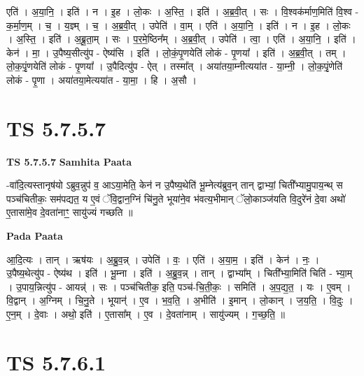 \documentclass[17pt]{extarticle}
\begin{document}
एति॑ । अ॒या॒नि॒ । इति॑ । न । इ॒ह । लो॒कः । अ॒स्ति॒ । इति॑ । अ॒ब्र॒वी॒त् । सः । वि॒श्वक॑र्माण॒मिति॑ वि॒श्व - क॒र्मा॒ण॒म् । च॒ । य॒ज्ञ्म् । च॒ । अ॒ब्र॒वी॒त् । उपेति॑ । वा॒म् । एति॑ । अ॒या॒नि॒ । इति॑ । न । इ॒ह । लो॒कः । अ॒स्ति॒ । इति॑ । अ॒ब्रू॒ता॒म् । सः । प॒र॒मे॒ष्ठिन᳚म् । अ॒ब्र॒वी॒त् । उपेति॑ । त्वा॒ । एति॑ । अ॒या॒नि॒ । इति॑ । केन॑ । मा॒ । उ॒पैष्य॒सीत्यु॑प - ऐष्य॑सि । इति॑ । लो॒कं॒पृ॒णयेति॑ लोकं - पृ॒णया᳚ । इति॑ । अ॒ब्र॒वी॒त् । तम् । लो॒क॒पृं॒णयेति॑ लोकं - पृ॒णया᳚ । उ॒पैदित्यु॑प - ऐत् । तस्मा᳚त् । अया॑तया॒म्नीत्यया॑त - या॒म्नी॒ । लो॒क॒पृं॒णेति॑ लोकं - पृ॒णा । अया॑तया॒मेत्यया॑त - या॒मा॒ । हि । अ॒सौ ।  \newline




\section*{ TS 5.7.5.7 }

\textbf{TS 5.7.5.7 } \newline
\textbf{Samhita Paata} \newline

-वा॑दि॒त्यस्तानृष॑यो ऽब्रुव॒न्नुप॑ व॒ आऽया॒मेति॒ केन॑ न उ॒पैष्य॒थेति॑ भू॒म्नेत्य॑ब्रुव॒न् तान् द्वाभ्यां॒ चिती᳚भ्यामु॒पाय॒न्थ् स पञ्च॑चितीकः॒ सम॑पद्यत॒ य ए॒वं ॅवि॒द्वान॒ग्निं चि॑नु॒ते भूया॑ने॒व भ॑वत्य॒भीमान् ॅलो॒काञ्ज॑यति वि॒दुरे॑नं दे॒वा अथो॑ ए॒तासा॑मे॒व दे॒वता॑नाꣳ॒॒ सायु॑ज्यं गच्छति ॥ \newline

\textbf{Pada Paata} \newline

आ॒दि॒त्यः । तान् । ऋष॑यः । अ॒ब्रु॒व॒न्न् । उपेति॑ । वः॒ । एति॑ । अ॒या॒म॒ । इति॑ । केन॑ । नः॒ । उ॒पैष्य॒थेत्यु॑प - ऐष्य॑थ । इति॑ । भू॒म्ना । इति॑ । अ॒ब्रु॒व॒न्न् । तान् । द्वाभ्या᳚म् । चिती᳚भ्या॒मिति॑ चिति॑ - भ्या॒म् । उ॒पाय॒न्नित्यु॑प - आयन्न्॑ । सः । पञ्च॑चितीक॒ इति॒ पञ्च॑-चि॒ती॒कः॒ । समिति॑ । अ॒प॒द्य॒त॒ । यः । ए॒वम् । वि॒द्वान् । अ॒ग्निम् । चि॒नु॒ते । भूयान्॑ । ए॒व । भ॒व॒ति॒ । अ॒भीति॑ । इ॒मान् । लो॒कान् । ज॒य॒ति॒ । वि॒दुः । ए॒न॒म् । दे॒वाः । अथो॒ इति॑ । ए॒तासा᳚म् । ए॒व । दे॒वता॑नाम् । सायु॑ज्यम् । ग॒च्छ॒ति॒ ॥  \newline




\section*{ TS 5.7.6.1 }
\end{document}
